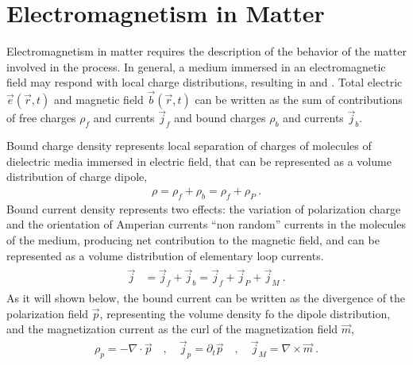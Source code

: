 \documentclass[letterpaper,10pt,english]{jupyterBook}
\begin{document}
\section{Electromagnetism in Matter}
\label{\detokenize{ch/principles-matter:electromagnetism-in-matter}}\label{\detokenize{ch/principles-matter:classical-electromagnetism-principles-matter}}\label{\detokenize{ch/principles-matter::doc}}
\sphinxAtStartPar
Electromagnetism in matter requires the description of the behavior of the matter involved in the process. In general, a medium immersed in an electromagnetic field may respond with local charge distributions, resulting in {\hyperref[\detokenize{ch/principles-matter-polarization:classical-electromagnetism-media-polarization}]{}} and {\hyperref[\detokenize{ch/principles-matter-magnetization:classical-electromagnetism-media-magnetization}]{}}. Total electric \(\vec{e}(\vec{r},t)\) and magnetic field \(\vec{b}(\vec{r},t)\) can be written as the sum of contributions of free charges \(\rho_f\) and currents \(\vec{j}_f\) and bound charges \(\rho_b\) and currents \(\vec{j}_b\).

\sphinxAtStartPar
Bound charge density represents local separation of charges of molecules of dielectric media immersed in electric field, that can be represented as a volume distribution of charge dipole,
\begin{equation*}
\begin{split}\rho = \rho_f + \rho_b = \rho_f + \rho_P \ .\end{split}
\end{equation*}
\sphinxAtStartPar
Bound current density represents two effects: the variation of polarization charge and the orientation of Amperian currents \sphinxhyphen{} “non random” currents in the molecules of the medium, producing net contribution to the magnetic field, and can be represented as a volume distribution of elementary loop currents.
\begin{equation*}
\begin{split}\begin{aligned}
  \vec{j} & = \vec{j}_f + \vec{j}_b 
            = \vec{j}_f + \vec{j}_P + \vec{j}_M  \ .
\end{aligned}\end{split}
\end{equation*}
\sphinxAtStartPar
As it will shown below, the bound current can be written as the divergence of the polarization field \(\vec{p}\), representing the volume density fo the dipole distribution, and the magnetization current as the curl of the magnetization field \(\vec{m}\),
\begin{equation*}
\begin{split}\rho_p = - \nabla \cdot \vec{p} \quad , \quad \vec{j}_p = \partial_t \vec{p} \quad , \quad \vec{j}_M = \nabla \times \vec{m} \ .\end{split}
\end{equation*}
\end{document}
